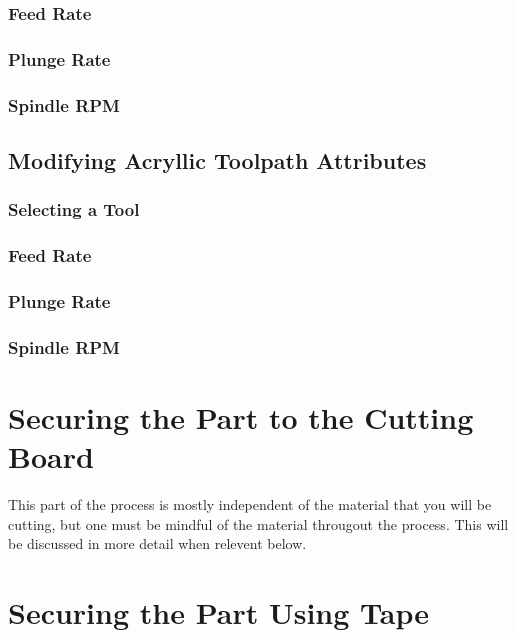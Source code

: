 \documentclass{article}
\begin{document}
\subsubsection{Feed Rate}

\subsubsection{Plunge Rate}

\subsubsection{Spindle RPM}



\subsection{Modifying Acryllic Toolpath Attributes}

\subsubsection{Selecting a Tool}

\subsubsection{Feed Rate}

\subsubsection{Plunge Rate}

\subsubsection{Spindle RPM}

\section{Securing the Part to the Cutting Board}
This part of the process is mostly independent of the material that you will be cutting, but one must be mindful of the material througout the 
process. This will be discussed in more detail when relevent below.

\section{Securing the Part Using Tape}
\end{document}
